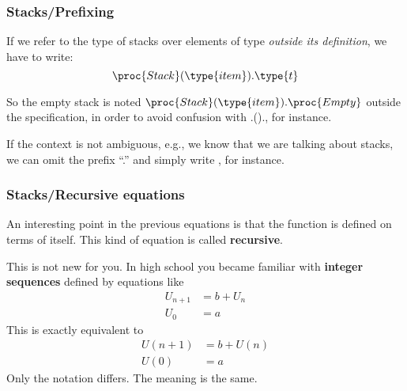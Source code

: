 %
\begin{frame}
\frametitle{Stacks/Prefixing}

If we refer to the type of stacks over elements of type
 \emph{outside its definition}, we have to write:
\[\proc{Stack} (\type{item}).\type{t}\]

\bigskip

So the empty stack is noted \(\proc{Stack}
(\type{item}).\proc{Empty}\) outside the  specification,
in order to avoid confusion with
.()., for instance.

\bigskip

If the context is not ambiguous, e.g., we know that we are talking
about stacks, we can omit the prefix ``.'' and simply
write , for instance.

\end{frame}

%
\begin{frame}
\frametitle{Stacks/Recursive equations}
\label{sequence}

An interesting point in the previous equations is that the function
 is defined on terms of itself. This kind of equation is
called \textbf{recursive}.

\bigskip

This is not new for you. In high school you became familiar with
\textbf{integer sequences} defined by equations like
\[\begin{aligned}
    U_{n+1} &= b + U_{n}\\
    U_{0} &= a
  \end{aligned}
\]
This is exactly equivalent to
\[\begin{aligned}
    U(n+1) &= b + U(n)\\
    U(0) &= a
  \end{aligned}
\]
Only the notation differs. The meaning is the same.

\end{frame}

